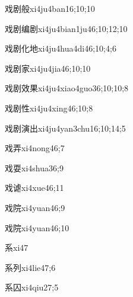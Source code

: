 \begin{verbete}{戏剧般}{xi4ju4ban1}{6;10;10}
\end{verbete}
\begin{verbete}{戏剧编剧}{xi4ju4bian1ju4}{6;10;12;10}
\end{verbete}
\begin{verbete}{戏剧化地}{xi4ju4hua4di4}{6;10;4;6}
\end{verbete}
\begin{verbete}{戏剧家}{xi4ju4jia4}{6;10;10}
\end{verbete}
\begin{verbete}{戏剧效果}{xi4ju4xiao4guo3}{6;10;10;8}
\end{verbete}
\begin{verbete}{戏剧性}{xi4ju4xing4}{6;10;8}
\end{verbete}
\begin{verbete}{戏剧演出}{xi4ju4yan3chu1}{6;10;14;5}
\end{verbete}
\begin{verbete}{戏弄}{xi4nong4}{6;7}
\end{verbete}
\begin{verbete}{戏耍}{xi4shua3}{6;9}
\end{verbete}
\begin{verbete}{戏谑}{xi4xue4}{6;11}
\end{verbete}
\begin{verbete}{戏院}{xi4yuan4}{6;9}
\end{verbete}
\begin{verbete}{戏院}{xi4yuan4}{6;10}
\end{verbete}
\begin{verbete}{系}{xi4}{7}
\end{verbete}
\begin{verbete}{系列}{xi4lie4}{7;6}
\end{verbete}
\begin{verbete}{系囚}{xi4qiu2}{7;5}
\end{verbete}
